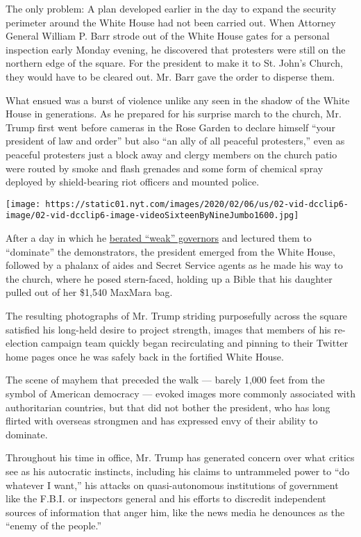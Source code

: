 The only problem: A plan developed earlier in the day to expand the
security perimeter around the White House had not been carried out. When
Attorney General William P. Barr strode out of the White House gates for
a personal inspection early Monday evening, he discovered that
protesters were still on the northern edge of the square. For the
president to make it to St. John's Church, they would have to be cleared
out. Mr. Barr gave the order to disperse them.

What ensued was a burst of violence unlike any seen in the shadow of the
White House in generations. As he prepared for his surprise march to the
church, Mr. Trump first went before cameras in the Rose Garden to
declare himself ``your president of law and order'' but also ``an ally
of all peaceful protesters,'' even as peaceful protesters just a block
away and clergy members on the church patio were routed by smoke and
flash grenades and some form of chemical spray deployed by
shield-bearing riot officers and mounted police.

\texttt{[image: https://static01.nyt.com/images/2020/02/06/us/02-vid-dcclip6-image/02-vid-dcclip6-image-videoSixteenByNineJumbo1600.jpg]}

After a day in which he
\href{https://www.nytimes.com/2020/06/01/us/politics/trump-governors.html}{berated
``weak'' governors} and lectured them to ``dominate'' the demonstrators,
the president emerged from the White House, followed by a phalanx of
aides and Secret Service agents as he made his way to the church, where
he posed stern-faced, holding up a Bible that his daughter pulled out of
her \$1,540 MaxMara bag.

The resulting photographs of Mr. Trump striding purposefully across the
square satisfied his long-held desire to project strength, images that
members of his re-election campaign team quickly began recirculating and
pinning to their Twitter home pages once he was safely back in the
fortified White House.

The scene of mayhem that preceded the walk --- barely 1,000 feet from
the symbol of American democracy --- evoked images more commonly
associated with authoritarian countries, but that did not bother the
president, who has long flirted with overseas strongmen and has
expressed envy of their ability to dominate.

Throughout his time in office, Mr. Trump has generated concern over what
critics see as his autocratic instincts, including his claims to
untrammeled power to ``do whatever I want,'' his attacks on
quasi-autonomous institutions of government like the F.B.I. or
inspectors general and his efforts to discredit independent sources of
information that anger him, like the news media he denounces as the
``enemy of the people.''

